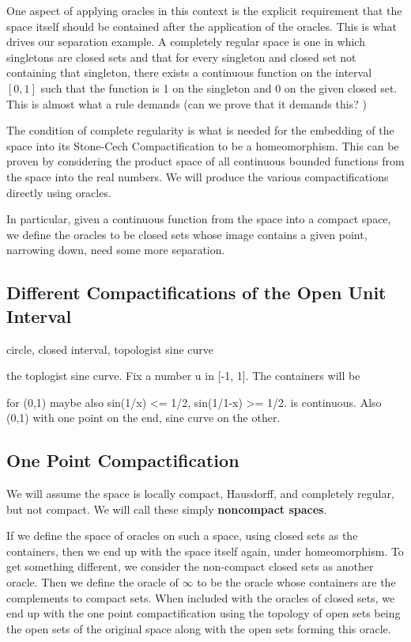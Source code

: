 \documentclass[12pt]{article}
\begin{document}
One aspect of applying oracles in this context is the explicit requirement that the space itself should be contained after the application of the oracles. This is what drives our separation example. A completely regular space is one in which singletons are closed sets and that for every singleton and closed set not containing that singleton, there exists a continuous function on the interval $[0,1]$ such that the function is 1 on the singleton and 0 on the given closed set. This is almost what a rule demands (can we prove that it demands this? ) 

The condition of complete regularity is what is needed for the embedding of the space into its Stone-Cech Compactification to be a homeomorphism. This can be proven by considering the product space of all continuous bounded functions from the space into the real numbers. We will produce the various compactifications directly using oracles. 

In particular, given a continuous function from the space into a compact space, we define the oracles to be closed sets whose image contains a given point, narrowing down, need some more separation. 


\subsection{Different Compactifications of the Open Unit Interval}

circle, closed interval, topologist sine curve

the toplogist sine curve. Fix a number u in [-1, 1]. The containers will be 

for (0,1) maybe also sin(1/x) <= 1/2,  sin(1/1-x) >= 1/2. is continuous. Also (0,1) with one point on the end, sine curve on the other. 


\subsection{One Point Compactification}

We will assume the space is locally compact, Hausdorff, and completely regular, but not compact. We will call these simply \textbf{noncompact spaces}. 

If we define the space of oracles on such a space, using closed sets as the containers, then we end up with the space itself again, under homeomorphism. To get something different, we consider the non-compact closed sets as another oracle. Then we define the oracle of $\infty$ to be the oracle whose containers are the complements to  compact sets. When included with the oracles of closed sets, we end up with the one point compactification using the topology of open sets being the open sets of the original space along with the open sets forming this oracle. 
\end{document}
